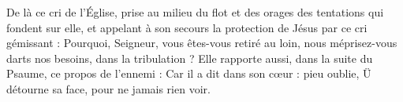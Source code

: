 De là ce cri de l’Église, prise au milieu du flot et des orages des tentations qui fondent sur elle, et appelant à son secours la protection de Jésus par ce cri gémissant : Pourquoi, Seigneur, vous êtes-vous retiré au loin, nous méprisez-vous darts nos besoins, dans la tribulation ? Elle rapporte aussi, dans la suite du Psaume, ce propos de l’ennemi : Car il a dit dans son cœur : pieu oublie, Ü détourne sa face, pour ne jamais rien voir.
